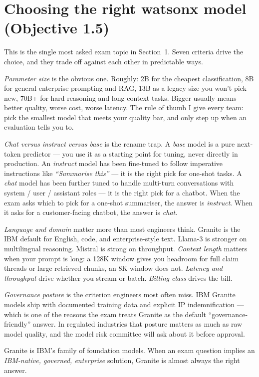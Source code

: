 \section{Choosing the right watsonx model (Objective 1.5)}

This is the single most asked exam topic in Section~1. Seven criteria drive the choice, and they trade off against each other in predictable ways.

\emph{Parameter size} is the obvious one. Roughly: 2B for the cheapest classification, 8B for general enterprise prompting and RAG, 13B as a legacy size you won't pick new, 70B+ for hard reasoning and long-context tasks. Bigger usually means better quality, worse cost, worse latency. The rule of thumb I give every team: pick the smallest model that meets your quality bar, and only step up when an evaluation tells you to.

\emph{Chat versus instruct versus base} is the rename trap. A \emph{base} model is a pure next-token predictor --- you use it as a starting point for tuning, never directly in production. An \emph{instruct} model has been fine-tuned to follow imperative instructions like \emph{``Summarise this''} --- it is the right pick for one-shot tasks. A \emph{chat} model has been further tuned to handle multi-turn conversations with system / user / assistant roles --- it is the right pick for a chatbot. When the exam asks which to pick for a one-shot summariser, the answer is \emph{instruct}. When it asks for a customer-facing chatbot, the answer is \emph{chat}.

\emph{Language and domain} matter more than most engineers think. Granite is the IBM default for English, code, and enterprise-style text. Llama-3 is stronger on multilingual reasoning. Mistral is strong on throughput. \emph{Context length} matters when your prompt is long: a 128K window gives you headroom for full claim threads or large retrieved chunks, an 8K window does not. \emph{Latency and throughput} drive whether you stream or batch. \emph{Billing class} drives the bill.

\emph{Governance posture} is the criterion engineers most often miss. IBM Granite models ship with documented training data and explicit IP indemnification --- which is one of the reasons the exam treats Granite as the default ``governance-friendly'' answer. In regulated industries that posture matters as much as raw model quality, and the model risk committee will ask about it before approval.

\begin{keybox}
Granite is IBM's family of foundation models. When an exam question implies an \emph{IBM-native, governed, enterprise} solution, Granite is almost always the right answer.
\end{keybox}

